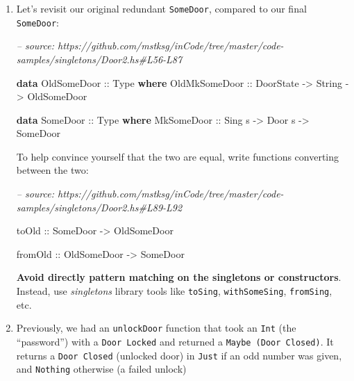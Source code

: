 \documentclass[]{article}
\newenvironment{Shaded}{}{}
\newcommand{\CommentTok}[1]{\textcolor[rgb]{0.38,0.63,0.69}{\textit{#1}}}
\newcommand{\DataTypeTok}[1]{\textcolor[rgb]{0.56,0.13,0.00}{#1}}
\newcommand{\KeywordTok}[1]{\textcolor[rgb]{0.00,0.44,0.13}{\textbf{#1}}}
\newcommand{\NormalTok}[1]{#1}
\newcommand{\OtherTok}[1]{\textcolor[rgb]{0.00,0.44,0.13}{#1}}
\begin{document}
\begin{enumerate}
\def\labelenumi{\arabic{enumi}.}
\item
  Let's revisit our original redundant \texttt{SomeDoor}, compared to our final
  \texttt{SomeDoor}:

\begin{Shaded}
\begin{Highlighting}[]
\CommentTok{-- source: https://github.com/mstksg/inCode/tree/master/code-samples/singletons/Door2.hs#L56-L87}

\KeywordTok{data} \DataTypeTok{OldSomeDoor}\OtherTok{ ::} \DataTypeTok{Type} \KeywordTok{where}
    \DataTypeTok{OldMkSomeDoor}\OtherTok{ ::} \DataTypeTok{DoorState} \OtherTok{->} \DataTypeTok{String} \OtherTok{->} \DataTypeTok{OldSomeDoor}

\KeywordTok{data} \DataTypeTok{SomeDoor}\OtherTok{ ::} \DataTypeTok{Type} \KeywordTok{where}
    \DataTypeTok{MkSomeDoor}\OtherTok{ ::} \DataTypeTok{Sing}\NormalTok{ s }\OtherTok{->} \DataTypeTok{Door}\NormalTok{ s }\OtherTok{->} \DataTypeTok{SomeDoor}
\end{Highlighting}
\end{Shaded}

  To help convince yourself that the two are equal, write functions converting
  between the two:

\begin{Shaded}
\begin{Highlighting}[]
\CommentTok{-- source: https://github.com/mstksg/inCode/tree/master/code-samples/singletons/Door2.hs#L89-L92}

\OtherTok{toOld ::} \DataTypeTok{SomeDoor} \OtherTok{->} \DataTypeTok{OldSomeDoor}

\OtherTok{fromOld ::} \DataTypeTok{OldSomeDoor} \OtherTok{->} \DataTypeTok{SomeDoor}
\end{Highlighting}
\end{Shaded}

  \textbf{Avoid directly pattern matching on the singletons or constructors}.
  Instead, use \emph{singletons} library tools like \texttt{toSing},
  \texttt{withSomeSing}, \texttt{fromSing}, etc.
\item
  Previously, we had an \texttt{unlockDoor} function that took an \texttt{Int}
  (the ``password'') with a \texttt{Door\ \textquotesingle{}Locked} and returned
  a \texttt{Maybe\ (Door\ \textquotesingle{}Closed)}. It returns a
  \texttt{Door\ \textquotesingle{}Closed} (unlocked door) in \texttt{Just} if an
  odd number was given, and \texttt{Nothing} otherwise (a failed unlock)


\end{enumerate}
\end{document}
